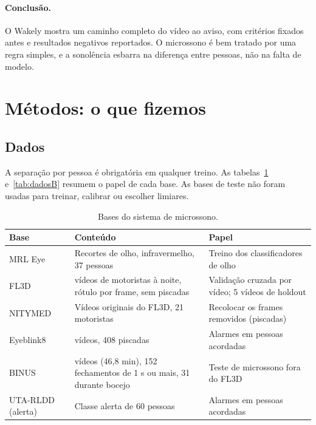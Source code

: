 \documentclass[11pt,a4paper]{article}
\begin{document}
\paragraph{Conclusão.} O Wakely mostra um caminho completo do vídeo ao aviso, com critérios fixados antes e resultados negativos reportados. O microssono é bem tratado por uma regra simples, e a sonolência esbarra na diferença entre pessoas, não na falta de modelo.

\section{Métodos: o que fizemos}
\label{sec:metodo}
\subsection{Dados}
\label{sec:dados}

A separação por pessoa é obrigatória em qualquer treino. As tabelas~\ref{tab:dadosA} e~\ref{tab:dadosB} resumem o papel de cada base. As bases de teste não foram usadas para treinar, calibrar ou escolher limiares.

\begin{table}[!t]
\centering\small
\caption{Bases do sistema de microssono.}
\label{tab:dadosA}
\begin{tabularx}{\textwidth}{@{}l>{\raggedright\arraybackslash}X>{\raggedright\arraybackslash}p{4.1cm}@{}}
\toprule
Base & Conteúdo & Papel \\
\midrule
MRL Eye & Recortes de olho, infravermelho, 37 pessoas & Treino dos classificadores de olho \\
FL3D~\cite{fl3d} & 44 vídeos de motoristas à noite, rótulo por frame, sem piscadas & Validação cruzada por vídeo; 5 vídeos de holdout \\
NITYMED~\cite{nitymed} & Vídeos originais do FL3D, 21 motoristas & Recolocar os frames removidos (piscadas) \\
Eyeblink8~\cite{eyeblink8} & 8 vídeos, 408 piscadas & Alarmes em pessoas acordadas \\
BINUS & 47 vídeos (46,8 min), 152 fechamentos de 1 s ou mais, 31 durante bocejo & Teste de microssono fora do FL3D \\
UTA-RLDD (alerta) & Classe alerta de 60 pessoas & Alarmes em pessoas acordadas \\
\bottomrule
\end{tabularx}
\end{table}
\end{document}
